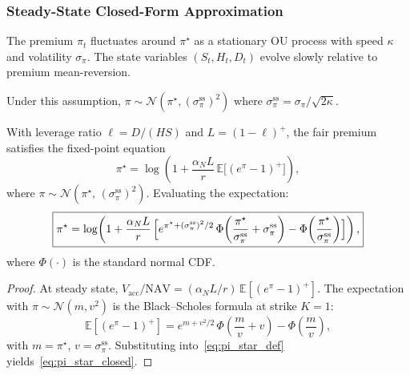 \subsubsection{Steady-State Closed-Form Approximation}
\label{sec:steady_state}

\begin{assumption}
  \label{ass:steady_state}
  The premium $\pi_t$ fluctuates around $\pi^\star$ as a stationary OU
  process with speed $\kappa$ and volatility $\sigma_\pi$.  The state
  variables $(S_t, H_t, D_t)$ evolve slowly relative to premium
  mean-reversion.
\end{assumption}

Under this assumption, $\pi \sim \mathcal{N}(\pi^\star, (\sigma_\pi^{\mathrm{ss}})^2)$
where $\sigma_\pi^{\mathrm{ss}} = \sigma_\pi / \sqrt{2\kappa}$.

\begin{proposition}
  \label{prop:steady_state}
  With leverage ratio $\ell = D/(HS)$ and $L = (1-\ell)^+$, the fair
  premium satisfies the fixed-point equation
  \begin{equation}
    \label{eq:pi_star_fp}
    \pi^\star
    = \log\!\left(
        1 + \frac{\alpha_N L}{r}\,
        \mathbb{E}\bigl[(e^{\pi} - 1)^+\bigr]
      \right),
  \end{equation}
  where $\pi \sim \mathcal{N}(\pi^\star,\, (\sigma_\pi^{\mathrm{ss}})^2)$.
  Evaluating the expectation:
  \begin{equation}
    \label{eq:pi_star_closed}
    \boxed{
      \pi^\star
      = \log\!\left(
          1 + \frac{\alpha_N L}{r}\,\Bigl[
            e^{\pi^\star + (\sigma_\pi^{\mathrm{ss}})^2/2}\,
            \Phi\!\left(\frac{\pi^\star}{\sigma_\pi^{\mathrm{ss}}}
              + \sigma_\pi^{\mathrm{ss}}\right)
            - \Phi\!\left(\frac{\pi^\star}{\sigma_\pi^{\mathrm{ss}}}\right)
          \Bigr]
        \right),
    }
  \end{equation}
  where $\Phi(\cdot)$ is the standard normal CDF.
\end{proposition}

\begin{proof}
  At steady state, $V_{\mathrm{acc}}/\mathrm{NAV} = (\alpha_N L / r)\,
  \mathbb{E}[(e^\pi - 1)^+]$.  The expectation with
  $\pi \sim \mathcal{N}(m, v^2)$ is the Black--Scholes formula at strike
  $K=1$:
  \[
    \mathbb{E}[(e^\pi - 1)^+]
    = e^{m + v^2/2}\,\Phi\!\left(\frac{m}{v} + v\right)
      - \Phi\!\left(\frac{m}{v}\right),
  \]
  with $m = \pi^\star$, $v = \sigma_\pi^{\mathrm{ss}}$.
  Substituting into~\eqref{eq:pi_star_def} yields~\eqref{eq:pi_star_closed}.
\end{proof}

